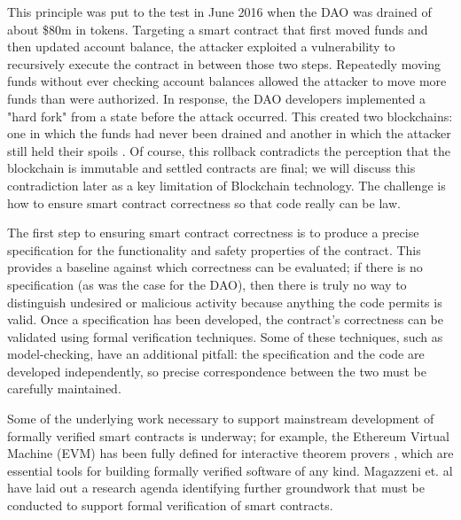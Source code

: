 This principle was put to the test in June 2016 when the DAO was drained of about \$80m in tokens. Targeting a smart contract that first moved funds and then updated account balance, the attacker exploited a vulnerability to recursively execute the contract in between those two steps. Repeatedly moving funds without ever checking account balances allowed the attacker to move more funds than were authorized. In response, the DAO developers implemented a "hard fork" from a state before the attack occurred. This created two blockchains: one in which the funds had never been drained and another in which the attacker still held their spoils \cite{Castillo16}. Of course, this rollback contradicts the perception that the blockchain is immutable and settled contracts are final; we will discuss this contradiction later as a key limitation of Blockchain technology. The challenge is how to ensure smart contract correctness so that code really can be law.

The first step to ensuring smart contract correctness is to produce a precise specification for the functionality and safety properties of the contract. This provides a baseline against which correctness can be evaluated; if there is no specification (as was the case for the DAO), then there is truly no way to distinguish undesired or malicious activity because anything the code permits is valid. Once a specification has been developed, the contract's correctness can be validated using formal verification techniques. Some of these techniques, such as model-checking, have an additional pitfall: the specification and the code are developed independently, so precise correspondence between the two must be carefully maintained.

Some of the underlying work necessary to support mainstream development of formally verified smart contracts is underway; for example, the Ethereum Virtual Machine (EVM) has been fully defined for interactive theorem provers \cite{Hirai17}, which are essential tools for building formally verified software of any kind. Magazzeni et. al \cite{Magazzeni17} have laid out a research agenda identifying further groundwork that must be conducted to support formal verification of smart contracts.

